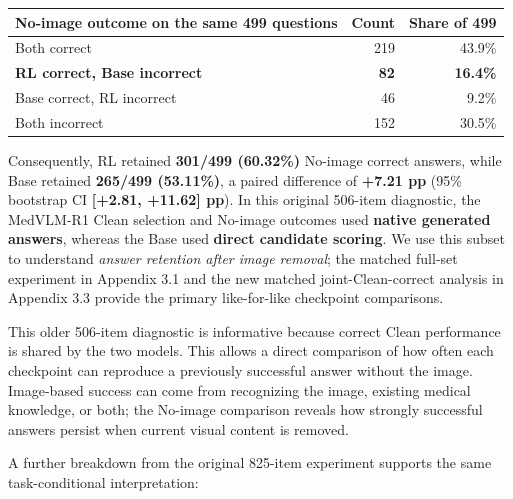 \documentclass[
  10pt,
  a4paper,
]{article}
\newcounter{none} %
\begin{document}
{\def\LTcaptype{none} %
\begin{longtable}[]{@{}lrr@{}}
\toprule\noalign{}
No-image outcome on the same 499 questions & Count & Share of 499 \\
\midrule\noalign{}
\endhead
\bottomrule\noalign{}
\endlastfoot
Both correct & 219 & 43.9\% \\
\textbf{RL correct, Base incorrect} & \textbf{82} & \textbf{16.4\%} \\
Base correct, RL incorrect & 46 & 9.2\% \\
Both incorrect & 152 & 30.5\% \\
\end{longtable}
}

Consequently, RL retained \textbf{301/499 (60.32\%)} No-image correct
answers, while Base retained \textbf{265/499 (53.11\%)}, a paired
difference of \textbf{+7.21 pp} (95\% bootstrap CI \textbf{{[}+2.81,
+11.62{]} pp}). In this original 506-item diagnostic, the MedVLM-R1
Clean selection and No-image outcomes used \textbf{native generated
answers}, whereas the Base used \textbf{direct candidate scoring}. We
use this subset to understand \emph{answer retention after image
removal}; the matched full-set experiment in Appendix 3.1 and the new
matched joint-Clean-correct analysis in Appendix 3.3 provide the primary
like-for-like checkpoint comparisons.

This older 506-item diagnostic is informative because correct Clean
performance is shared by the two models. This allows a direct comparison
of how often each checkpoint can reproduce a previously successful
answer without the image. Image-based success can come from recognizing
the image, existing medical knowledge, or both; the No-image comparison
reveals how strongly successful answers persist when current visual
content is removed.

A further breakdown from the original 825-item experiment supports the
same task-conditional interpretation:
\end{document}
